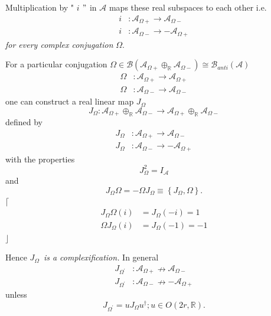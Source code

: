 \documentclass[aps,preprint]{revtex4}
\begin{document}
Multiplication by " $i$ $"$ in $\mathcal{A}$ maps these real subspaces to
each other i.e. 
\begin{align}
i & :\mathcal{A}_{\Omega+}\rightarrow\mathcal{A}_{\Omega-} \\
i & :\mathcal{A}_{\Omega-}\rightarrow-\mathcal{A}_{\Omega+}
\end{align}
\emph{for every complex conjugation }$\Omega.$

For a particular conjugation $\Omega \in \mathcal{B}\left( \mathcal{A}%
_{\Omega +}\oplus _{\mathbb{R}}\mathcal{A}_{\Omega -}\right) \cong \mathcal{B%
}_{anti}\left( \mathcal{A}\right) $ 
\begin{align}
\Omega & :\mathcal{A}_{\Omega +}\rightarrow \mathcal{A}_{\Omega +} \\
\Omega & :\mathcal{A}_{\Omega -}\rightarrow \mathcal{A}_{\Omega -}
\end{align}%
one can construct a real linear map $J_{\Omega }$ 
\begin{equation}
J_{\Omega }:\mathcal{A}_{\Omega +}\oplus _{\mathbb{R}}\mathcal{A}_{\Omega -}%
\mathcal{\rightarrow A}_{\Omega +}\oplus _{\mathbb{R}}\mathcal{A}_{\Omega -}
\end{equation}%
defined by 
\begin{align}
J_{\Omega }& :\mathcal{A}_{\Omega +}\rightarrow \mathcal{A}_{\Omega -} \\
J_{\Omega }& :\mathcal{A}_{\Omega -}\rightarrow -\mathcal{A}_{\Omega +}
\end{align}%
with the properties 
\begin{equation}
J_{\Omega }^{2}=I_{\mathcal{A}}
\end{equation}%
and%
\begin{equation}
J_{\Omega }\Omega =-\Omega J_{\Omega }\equiv \left\{ J_{\Omega },\Omega
\right\} .
\end{equation}%
$\lceil $%
\begin{align}
J_{\Omega }\Omega \left( i\right) & =J_{\Omega }\left( -i\right) =1 \\
\Omega J_{\Omega }\left( i\right) & =J_{\Omega }\left( -1\right) =-1
\end{align}%
$\rfloor $

Hence $J_{\Omega }$\emph{\ is a complexification.} In general 
\begin{align}
J_{\Omega ^{\prime }}& :\mathcal{A}_{\Omega +}\nrightarrow \mathcal{A}%
_{\Omega -} \\
J_{\Omega ^{\prime }}& :\mathcal{A}_{\Omega -}\nrightarrow -\mathcal{A}%
_{\Omega +}
\end{align}%
unless 
\begin{equation}
J_{\Omega ^{\prime }}=uJ_{\Omega }u^{\dagger };u\in O\left( 2r,\mathbb{R}%
\right) .
\end{equation}
\end{document}
